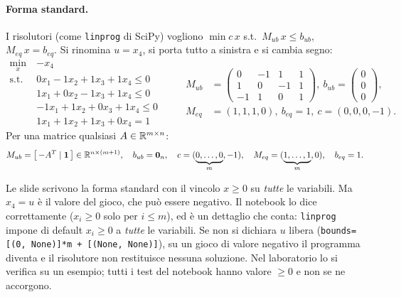 \paragraph{Forma standard.}
I risolutori (come \texttt{linprog} di SciPy) vogliono
$\min c\,x$ s.t.\ $M_{ub}\,x \le b_{ub}$, $M_{eq}\,x = b_{eq}$. Si rinomina $u = x_4$, si
porta tutto a sinistra e si cambia segno:
\[
\begin{aligned}
  \min_x\ & -x_4\\
  \text{s.t. }\ & 0x_1 - 1x_2 + 1x_3 + 1x_4 \le 0\\
  & 1x_1 + 0x_2 - 1x_3 + 1x_4 \le 0\\
  & -1x_1 + 1x_2 + 0x_3 + 1x_4 \le 0\\
  & 1x_1 + 1x_2 + 1x_3 + 0x_4 = 1
\end{aligned}
\qquad
\begin{aligned}
  M_{ub} &= \begin{pmatrix} 0&-1&1&1\\ 1&0&-1&1\\ -1&1&0&1 \end{pmatrix},\
  b_{ub} = \begin{pmatrix}0\\0\\0\end{pmatrix},\\
  M_{eq} &= (1,1,1,0),\ b_{eq} = 1,\ c = (0,0,0,-1).
\end{aligned}
\]
Per una matrice qualsiasi $A \in \mathbb{R}^{m\times n}$:
\[
  M_{ub} = \bigl[\,-A^T \mid \mathbf{1}\,\bigr] \in \mathbb{R}^{n\times(m+1)},\quad
  b_{ub} = \mathbf{0}_n,\quad
  c = (\underbrace{0,\dots,0}_{m}, -1),\quad
  M_{eq} = (\underbrace{1,\dots,1}_{m}, 0),\quad b_{eq} = 1 .
\]

\begin{attenzione}
Le slide scrivono la forma standard con il vincolo $x \ge 0$ su \emph{tutte} le variabili.
Ma $x_4 = u$ è il valore del gioco, che può essere negativo. Il notebook lo dice
correttamente ($x_i \ge 0$ solo per $i \le m$), ed è un dettaglio che conta: \texttt{linprog}
impone di default $x_i \ge 0$ a \emph{tutte} le variabili. Se non si dichiara $u$ libera
(\texttt{bounds=[(0, None)]*m + [(None, None)]}), su un gioco di valore negativo il
programma diventa \kw{impossibile} e il risolutore non restituisce nessuna soluzione. Nel
laboratorio lo si verifica su un esempio; tutti i test del notebook hanno valore
$\ge 0$ e non se ne accorgono.
\end{attenzione}

